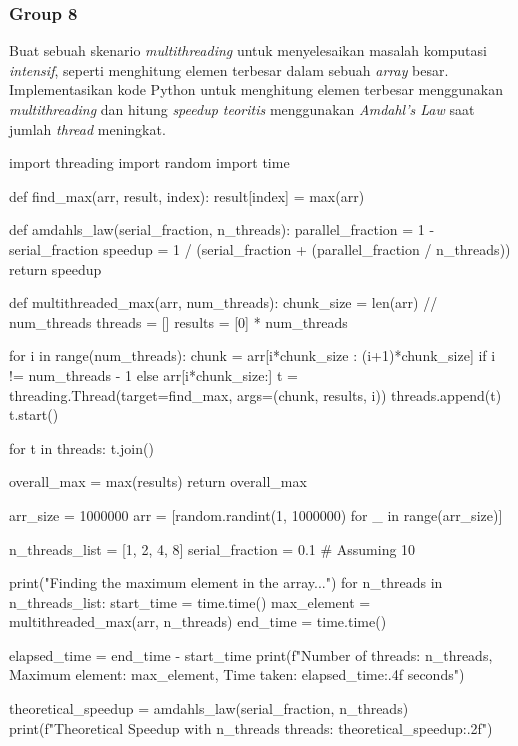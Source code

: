 \documentclass[12pt]{article}
\begin{document}
\subsubsection{Group 8}
Buat sebuah skenario \textit{multithreading}  untuk menyelesaikan masalah komputasi \textit{intensif}, seperti menghitung elemen terbesar dalam sebuah \textit{array} besar. Implementasikan kode Python untuk menghitung elemen terbesar menggunakan \textit{multithreading} dan hitung \textit{speedup teoritis} menggunakan \textit{Amdahl's Law} saat jumlah \textit{thread} meningkat.
\begin{python}
    import threading
    import random
    import time
    
    
    def find_max(arr, result, index):
        result[index] = max(arr)
    
    
    def amdahls_law(serial_fraction, n_threads):
        parallel_fraction = 1 - serial_fraction
        speedup = 1 / (serial_fraction + (parallel_fraction / n_threads))
        return speedup
    
    
    def multithreaded_max(arr, num_threads):
        chunk_size = len(arr) // num_threads
        threads = []
        results = [0] * num_threads
    
        for i in range(num_threads):
            chunk = arr[i*chunk_size : (i+1)*chunk_size] if i != num_threads - 1 else arr[i*chunk_size:]
            t = threading.Thread(target=find_max, args=(chunk, results, i))
            threads.append(t)
            t.start()
    
        for t in threads:
            t.join()
    
        overall_max = max(results)
        return overall_max
    
    
    arr_size = 1000000
    arr = [random.randint(1, 1000000) for _ in range(arr_size)]
    
    
    n_threads_list = [1, 2, 4, 8]
    serial_fraction = 0.1  # Assuming 10%
    
    print("Finding the maximum element in the array...")
    for n_threads in n_threads_list:
        start_time = time.time()
        max_element = multithreaded_max(arr, n_threads)
        end_time = time.time()
    
        elapsed_time = end_time - start_time
        print(f"Number of threads: {n_threads}, Maximum element: {max_element}, Time taken: {elapsed_time:.4f} seconds")
    
        
        theoretical_speedup = amdahls_law(serial_fraction, n_threads)
        print(f"Theoretical Speedup with {n_threads} threads: {theoretical_speedup:.2f}\n")    
\end{python}
\end{document}
